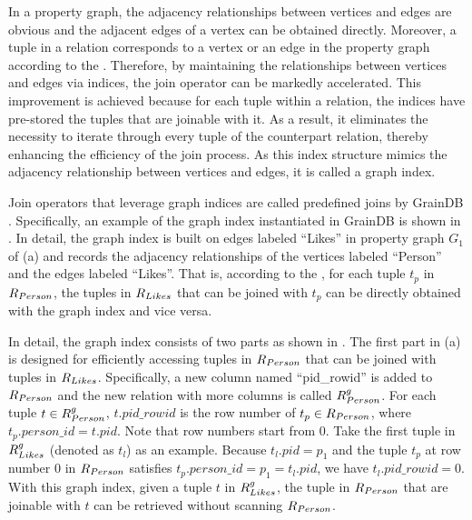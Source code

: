 In a property graph, the adjacency relationships between vertices and edges are obvious and the adjacent edges of a vertex can be obtained directly.
Moreover, a tuple in a relation corresponds to a vertex or an edge in the property graph according to the \rgmapping.
Therefore, by maintaining the relationships between vertices and edges via indices, the join operator can be markedly accelerated.
This improvement is achieved because for each tuple within a relation, the indices have pre-stored the tuples that are joinable with it.
As a result, it eliminates the necessity to iterate through every tuple of the counterpart relation, thereby enhancing the efficiency of the join process.
As this index structure mimics the adjacency relationship between vertices and edges, it is called a graph index.

Join operators that leverage graph indices are called predefined joins by GrainDB \cite{graindb}.
Specifically, an example of the graph index instantiated in GrainDB is shown in .
In detail, the graph index is built on edges labeled ``Likes'' in property graph $G_1$ of (a) and records the adjacency relationships of the vertices labeled ``Person'' and the edges labeled ``Likes''.
That is, according to the \rgmapping, for each tuple $t_p$ in ${R_{Person}}$, the tuples in ${R_{Likes}}$ that can be joined with $t_p$ can be directly obtained with the graph index and vice versa.

In detail, the graph index consists of two parts as shown in .
The first part in (a) is designed for efficiently accessing tuples in ${R_{Person}}$ that can be joined with tuples in ${R_{Likes}}$.
Specifically, a new column named ``pid\_rowid'' is added to ${R_{Person}}$ and the new relation with more columns is called ${R^g_{Person}}$.
For each tuple $t \in {\ensuremath R^g_{Person}}$, $t.pid\_rowid$ is the row number of $t_p \in {\ensuremath R_{Person}}$, where $t_p.person\_id = t.pid$.
Note that row numbers start from 0.
Take the first tuple in ${R^g_{Likes}}$ (denoted as $t_l$) as an example.
Because $t_l.pid = p_1$ and the tuple $t_p$ at row number 0 in ${R_{Person}}$ satisfies $t_p.person\_id = p_1 = t_l.pid$, we have $t_l.pid\_rowid = 0$.
With this graph index, given a tuple $t$ in ${R^g_{Likes}}$, the tuple in ${R_{Person}}$ that are joinable with $t$ can be retrieved without scanning ${R_{Person}}$.

